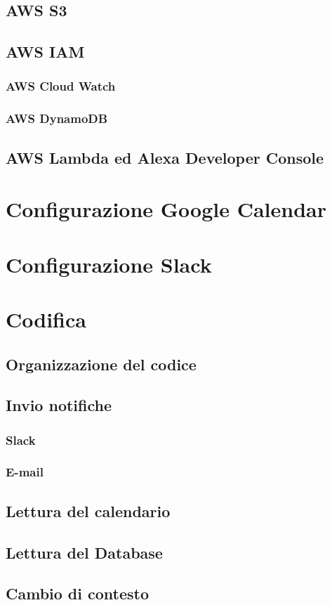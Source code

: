\subsection{AWS S3}
\subsection{AWS IAM}
\subsubsection{AWS Cloud Watch}
\subsubsection{AWS DynamoDB}
\subsection{AWS Lambda ed Alexa Developer Console}

\section{Configurazione Google Calendar}

\section{Configurazione Slack}

\section{Codifica}
\subsection{Organizzazione del codice}
\subsection{Invio notifiche}
\subsubsection{Slack}
\subsubsection{E-mail}
\subsection{Lettura del calendario}
\subsection{Lettura del Database}
\subsection{Cambio di contesto}
